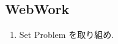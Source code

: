 \subsection{WebWork}
\begin{enumerate}
  \item Set Problem を取り組め.
\end{enumerate}

\endinput
\newpage
\section{11/15回目: \schoolCalender{11}}
\subsection{問題}
\begin{quiz}
\end{quiz}

\subsection{WebWork}
\begin{enumerate}
  \item Set Problem を取り組め.
\end{enumerate}

\endinput
\newpage
\section{12/15回目: \schoolCalender{12}}
\subsection{問題}

\subsection{WebWork}
\begin{enumerate}
  \item Set Problem を取り組め.
\end{enumerate}

\endinput
\newpage
\section{13/15回目: \schoolCalender{13}}
\subsection{問題}

